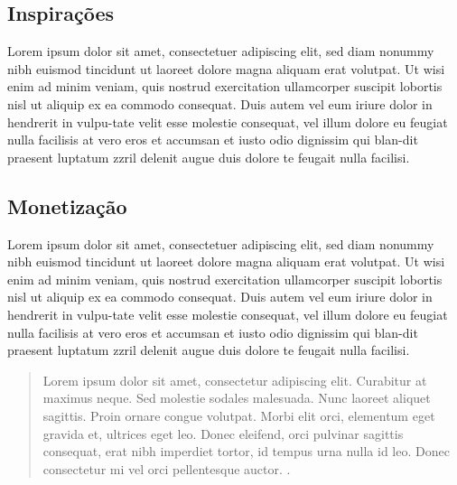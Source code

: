 \subsection{Inspirações}
\label{secao:inspiracoes}
Lorem ipsum dolor sit amet, consectetuer adipiscing elit, sed diam nonummy nibh euismod tincidunt ut laoreet dolore magna aliquam erat volutpat. Ut wisi enim ad minim veniam, quis nostrud exercitation ullamcorper suscipit lobortis nisl ut aliquip ex ea commodo consequat. Duis autem vel eum iriure dolor in hendrerit in vulpu-tate velit esse molestie consequat, vel illum dolore eu feugiat nulla facilisis at vero eros et accumsan et iusto odio dignissim qui blan-dit praesent luptatum zzril delenit augue duis dolore te feugait nulla facilisi.

\subsection{Monetização}
\label{secao:monetizacao}
Lorem ipsum dolor sit amet, consectetuer adipiscing elit, sed diam nonummy nibh euismod tincidunt ut laoreet dolore magna aliquam erat volutpat. Ut wisi enim ad minim veniam, quis nostrud exercitation ullamcorper suscipit lobortis nisl ut aliquip ex ea commodo consequat. Duis autem vel eum iriure dolor in hendrerit in vulpu-tate velit esse molestie consequat, vel illum dolore eu feugiat nulla facilisis at vero eros et accumsan et iusto odio dignissim qui blan-dit praesent luptatum zzril delenit augue duis dolore te feugait nulla facilisi.

\begin{quote}
	Lorem ipsum dolor sit amet, consectetur adipiscing elit. Curabitur at maximus neque. Sed molestie sodales malesuada. Nunc laoreet aliquet sagittis. Proin ornare congue volutpat. Morbi elit orci, elementum eget gravida et, ultrices eget leo. Donec eleifend, orci pulvinar sagittis consequat, erat nibh imperdiet tortor, id tempus urna nulla id leo. Donec consectetur mi vel orci pellentesque auctor.  \cite[p. 7]{notes2002}.
\end{quote}

